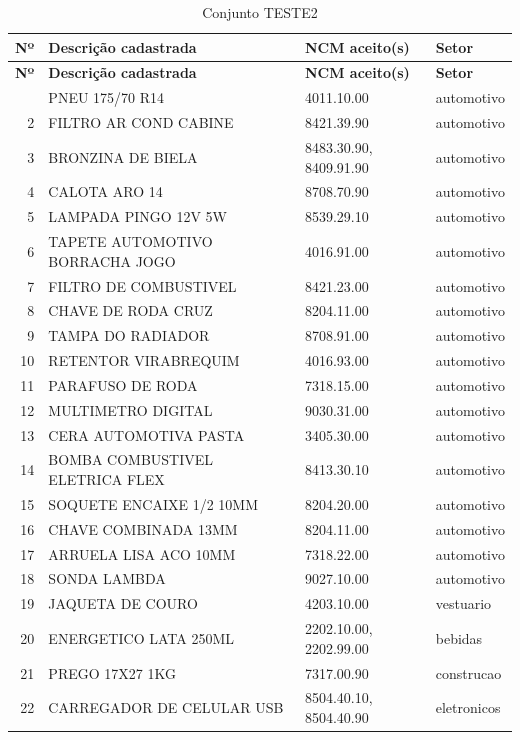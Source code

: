 \begin{apendicesenv}
\begin{center}
\small
\begin{longtable}{r p{6.6cm} p{4.4cm} p{2.6cm}}
\caption{Conjunto TESTE2}\label{tab:ap_teste2} \\
\hline
\textbf{Nº} & \textbf{Descrição cadastrada} & \textbf{NCM aceito(s)} & \textbf{Setor} \\
\hline
\endfirsthead
\hline
\textbf{Nº} & \textbf{Descrição cadastrada} & \textbf{NCM aceito(s)} & \textbf{Setor} \\
\hline
\endhead
\hline
\endfoot
1 & PNEU 175/70 R14 & 4011.10.00 & automotivo \\
2 & FILTRO AR COND CABINE & 8421.39.90 & automotivo \\
3 & BRONZINA DE BIELA & 8483.30.90, 8409.91.90 & automotivo \\
4 & CALOTA ARO 14 & 8708.70.90 & automotivo \\
5 & LAMPADA PINGO 12V 5W & 8539.29.10 & automotivo \\
6 & TAPETE AUTOMOTIVO BORRACHA JOGO & 4016.91.00 & automotivo \\
7 & FILTRO DE COMBUSTIVEL & 8421.23.00 & automotivo \\
8 & CHAVE DE RODA CRUZ & 8204.11.00 & automotivo \\
9 & TAMPA DO RADIADOR & 8708.91.00 & automotivo \\
10 & RETENTOR VIRABREQUIM & 4016.93.00 & automotivo \\
11 & PARAFUSO DE RODA & 7318.15.00 & automotivo \\
12 & MULTIMETRO DIGITAL & 9030.31.00 & automotivo \\
13 & CERA AUTOMOTIVA PASTA & 3405.30.00 & automotivo \\
14 & BOMBA COMBUSTIVEL ELETRICA FLEX & 8413.30.10 & automotivo \\
15 & SOQUETE ENCAIXE 1/2 10MM & 8204.20.00 & automotivo \\
16 & CHAVE COMBINADA 13MM & 8204.11.00 & automotivo \\
17 & ARRUELA LISA ACO 10MM & 7318.22.00 & automotivo \\
18 & SONDA LAMBDA & 9027.10.00 & automotivo \\
19 & JAQUETA DE COURO & 4203.10.00 & vestuario \\
20 & ENERGETICO LATA 250ML & 2202.10.00, 2202.99.00 & bebidas \\
21 & PREGO 17X27 1KG & 7317.00.90 & construcao \\
22 & CARREGADOR DE CELULAR USB & 8504.40.10, 8504.40.90 & eletronicos \\

\end{longtable}
\end{center}
\end{apendicesenv}
